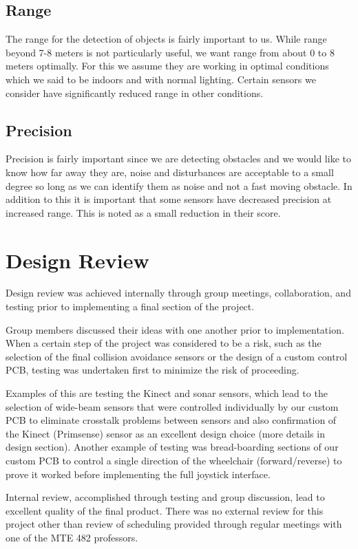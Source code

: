 \documentclass[oneside,final,a4paper]{report}
\begin{document}
\subsection{Range}
The range for the detection of objects is fairly important to us. While range beyond 7-8 meters is not particularly useful, we want range from about 0 to 8 meters optimally. For this we assume they are working in optimal conditions which we said to be indoors and with normal lighting. Certain sensors we consider have significantly reduced range in other conditions.

\subsection{Precision}
Precision is fairly important since we are detecting obstacles and we would like to know how far away they are, noise and disturbances are acceptable to a small degree so long as we can identify them as noise and not a fast moving obstacle. In addition to this it is important that some sensors have decreased precision at increased range. This is noted as a small reduction in their score.

\section{Design Review}
Design review was achieved internally through group meetings, collaboration, and testing prior to implementing a final section of the project.

Group members discussed their ideas with one another prior to implementation. When a certain step of the project was considered to be a risk, such as the selection of the final collision avoidance sensors or the design of a custom control PCB, testing was undertaken first to minimize the risk of proceeding. 

Examples of this are testing the Kinect and sonar sensors, which lead to the selection of wide-beam sensors that were controlled individually by our custom PCB to eliminate crosstalk problems between sensors and also confirmation of the Kinect (Primsense) sensor as an excellent design choice (more details in design section). Another example of testing was bread-boarding sections of our custom PCB to control a single direction of the wheelchair (forward/reverse) to prove it worked before implementing the full joystick interface.

Internal review, accomplished through testing and group discussion, lead to excellent quality of the final product. There was no external review for this project other than review of scheduling provided through regular meetings with one of the MTE 482 professors.
\end{document}
